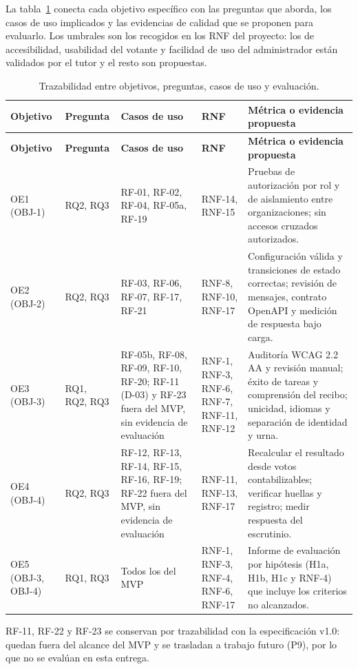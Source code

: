 La tabla~\ref{tab:trazabilidad-investigacion} conecta cada objetivo
específico con las preguntas que aborda, los casos de uso implicados y las
evidencias de calidad que se proponen para evaluarlo. Los umbrales son los
recogidos en los RNF del proyecto: los de accesibilidad, usabilidad del
votante y facilidad de uso del administrador están validados por el tutor y el
resto son propuestas.

\small
\setlength{\tabcolsep}{3.5pt}
\begin{longtable}{|p{}|p{}|p{}|p{}|p{}|}
\caption{Trazabilidad entre objetivos, preguntas, casos de uso y evaluación.}\label{tab:trazabilidad-investigacion}\\
\hline
\textbf{Objetivo} & \textbf{Pregunta} & \textbf{Casos de uso} & \textbf{RNF} & \textbf{Métrica o evidencia propuesta} \\
\hline
\endfirsthead
\hline
\textbf{Objetivo} & \textbf{Pregunta} & \textbf{Casos de uso} & \textbf{RNF} & \textbf{Métrica o evidencia propuesta} \\
\hline
\endhead
\hline
\endfoot
\hline
\endlastfoot
OE1 (OBJ-1) & RQ2, RQ3 & RF-01, RF-02, RF-04, RF-05a, RF-19 & RNF-14, RNF-15 & Pruebas de autorización por rol y de aislamiento entre organizaciones; sin accesos cruzados autorizados. \\
\hline
OE2 (OBJ-2) & RQ2, RQ3 & RF-03, RF-06, RF-07, RF-17, RF-21 & RNF-8, RNF-10, RNF-17 & Configuración válida y transiciones de estado correctas; revisión de mensajes, contrato OpenAPI y medición de respuesta bajo carga. \\
\hline
OE3 (OBJ-3) & RQ1, RQ2, RQ3 & RF-05b, RF-08, RF-09, RF-10, RF-20; RF-11 \mbox{(D-03)} y RF-23 fuera del MVP, sin evidencia de evaluación & RNF-1, RNF-3, RNF-6, RNF-7, RNF-11, RNF-12 & Auditoría WCAG 2.2 AA y revisión manual; éxito de tareas y comprensión del recibo; unicidad, idiomas y separación de identidad y urna. \\
\hline
OE4 (OBJ-4) & RQ2, RQ3 & RF-12, RF-13, RF-14, RF-15, RF-16, RF-19; RF-22 fuera del MVP, sin evidencia de evaluación & RNF-11, RNF-13, RNF-17 & Recalcular el resultado desde votos contabilizables; verificar huellas y registro; medir respuesta del escrutinio. \\
\hline
OE5 (OBJ-3, OBJ-4) & RQ1, RQ3 & Todos los del MVP & RNF-1, RNF-3, RNF-4, RNF-6, RNF-17 & Informe de evaluación por hipótesis (H1a, H1b, H1c y RNF-4) que incluye los criterios no alcanzados. \\
\hline
\end{longtable}
\setlength{\tabcolsep}{6pt}
\normalsize
\noindent\footnotesize RF-11, RF-22 y RF-23 se conservan por trazabilidad con la especificación v1.0:
quedan fuera del alcance del MVP y se trasladan a trabajo futuro (P9), por lo que no se evalúan en esta
entrega.\normalsize

